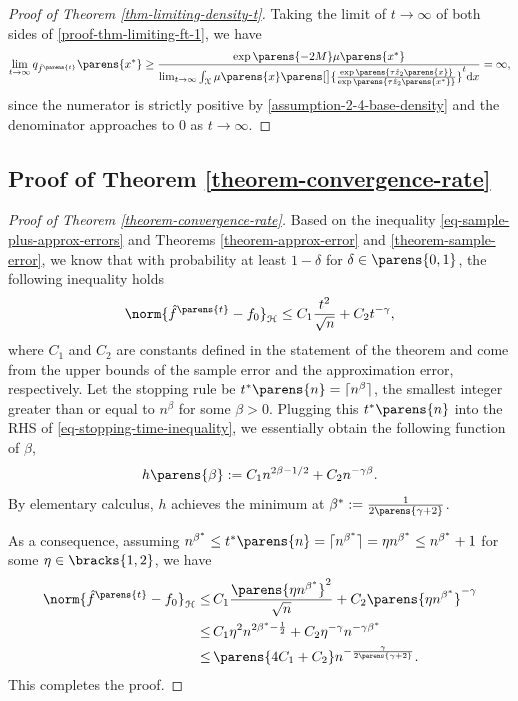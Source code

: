 \begin{proof}[Proof of Theorem \ref{thm-limiting-density-t}]
	Taking the limit of $t \to \infty$ of both sides of \eqref{proof-thm-limiting-ft-1}, we have 
	\begin{align*}
		\lim_{t \to \infty} q_{\hat{f}^{\parens{t}}} \parens{x^*} \ge \frac{\exp \parens{-2M} \mu \parens{x^*}}{\lim_{t \to \infty} \int_{\calX} \mu \parens{x} \parens[\big]{\frac{\exp \parens{\tau \hat{z}_2 \parens{x} }}{\exp \parens{\tau \hat{z}_2 \parens{x^*}}}}^t \diff x} = \infty, 
	\end{align*}
	since the numerator is strictly positive by \ref{assumption-2-4-base-density} and the denominator approaches to 0 as $t \to \infty$. 
\end{proof}


\subsection{Proof of Theorem \ref{theorem-convergence-rate}}\label{proof-theorem-convergence-rate}

\begin{proof}[Proof of Theorem \ref{theorem-convergence-rate}]
	Based on the inequality \eqref{eq-sample-plus-approx-errors} and Theorems \ref{theorem-approx-error} and \ref{theorem-sample-error}, we know that with probability at least $1 - \delta$ for $\delta \in \parens{0, 1}$, the following inequality holds 
	\begin{align}\label{eq-stopping-time-inequality}
		\norm{\hat{f}^{\parens{t}} - f_0}_{\hil} \le C_1 \frac{t^2}{\sqrt{n}} + C_2 t^{-\gamma}, 
	\end{align}
	where $C_1$ and $C_2$ are constants defined in the statement of the theorem and come from the upper bounds of the sample error and the approximation error, respectively. Let the stopping rule be $t^* \parens{n} = \ceil{n^{\beta}}$, the smallest integer greater than or equal to $n^{\beta}$ for some $\beta > 0$. Plugging this $t^* \parens{n}$ into the RHS of \eqref{eq-stopping-time-inequality}, we essentially obtain the following function of $\beta$, 
	\begin{align*}
		h \parens{\beta} := C_1 n^{2 \beta - 1/2} + C_2 n^{-\gamma \beta}. 
	\end{align*} 
	By elementary calculus, $h$ achieves the minimum at $\beta^* := \frac{1}{2\parens{\gamma + 2}}$. 

	As a consequence, assuming $n^{\beta^*} \le t^*\parens{n} = \ceil{n^{\beta^*}} = \eta n^{\beta^*} \le n^{\beta^*} + 1$ for some $\eta \in \bracks{1, 2}$, we have 
	\begin{align*}
		\norm{\hat{f}^{\parens{t}} - f_0}_{\calH} \le & \, C_1 \frac{\parens{\eta n^{\beta^*}}^{2}}{\sqrt{n}} + C_2 \parens{\eta  n^{\beta^*}}^{-\gamma} \\ 
		\le & \, C_1 \eta^2 n^{2 \beta^* - \frac{1}{2}} + C_2 \eta^{-\gamma} n^{-\gamma \beta^*} \\ 
		\le & \, \parens{4 C_1 + C_2} n^{-\frac{\gamma}{2 \parens{\gamma+2}}}. 
	\end{align*}
	This completes the proof. 
\end{proof}

